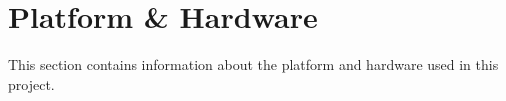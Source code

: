 \section{Platform \& Hardware}
This section contains information about the platform and hardware used in this project.


